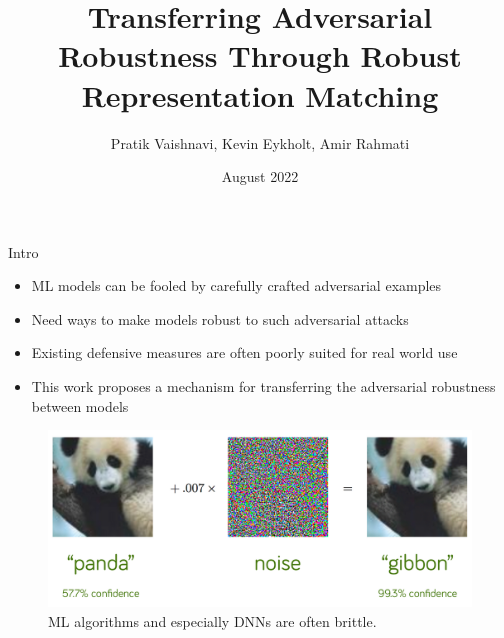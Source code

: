 \documentclass{beamer}
\title[]{Transferring Adversarial Robustness Through Robust Representation Matching}
\author{Pratik Vaishnavi, Kevin Eykholt, Amir Rahmati}
\date{August 2022}
\begin{document}
\begin{frame}
  \titlepage
\end{frame}



\begin{frame}{Intro}

\begin{itemize}
	\item ML models can be fooled by carefully crafted adversarial examples
	\item Need ways to make models robust to such adversarial attacks
	\item Existing defensive measures are often poorly suited for real world use
	\item This work proposes a mechanism for transferring the adversarial robustness between models
\end{itemize}

\end{frame}



\begin{frame}{}
	
	\begin{figure}
		\centering
		\includegraphics[scale=.25]{./images/adversarial_evasion_attack.png}
		\caption{ML algorithms and especially DNNs are often brittle.}
	\end{figure}
	
\end{frame}

\end{document}
